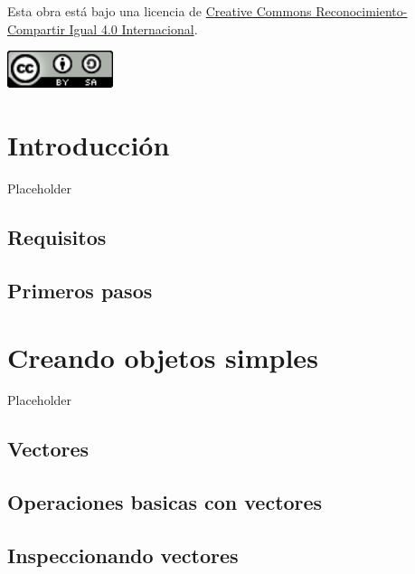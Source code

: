 \documentclass[
]{book}
\begin{document}
Esta obra está bajo una licencia de \href{https://creativecommons.org/licenses/by-sa/4.0/deed.es}{Creative Commons Reconocimiento-Compartir Igual 4.0 Internacional}.

\begin{flushleft}\includegraphics[width=1.22in]{images/by-sa-88x31} \end{flushleft}

\hypertarget{intro}{%
\chapter{Introducción}\label{intro}}

Placeholder

\hypertarget{requisitos}{%
\section{Requisitos}\label{requisitos}}

\hypertarget{primeros-pasos}{%
\section{Primeros pasos}\label{primeros-pasos}}

\hypertarget{creando-objetos-simples}{%
\chapter{Creando objetos simples}\label{creando-objetos-simples}}

Placeholder

\hypertarget{vectores}{%
\section{Vectores}\label{vectores}}

\hypertarget{operaciones-basicas-con-vectores}{%
\section{Operaciones basicas con vectores}\label{operaciones-basicas-con-vectores}}

\hypertarget{inspeccionando-vectores}{%
\section{Inspeccionando vectores}\label{inspeccionando-vectores}}
\end{document}
